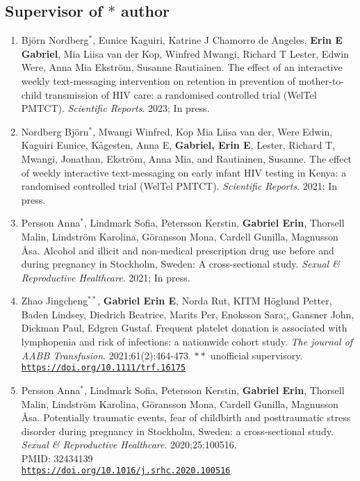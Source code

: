 \documentclass[12pt]{article}
\providecommand \url[1]{\href{#1}{#1}}
\renewcommand*\url[1]{\href{#1}{\texttt{#1}}}
\begin{document}
\subsection*{Supervisor of $*$ author}
\begin{enumerate}

\item Björn Nordberg$^*$, Eunice Kaguiri, Katrine J Chamorro de Angeles, \textbf{Erin E Gabriel}, Mia Liisa van der Kop, Winfred Mwangi, Richard T Lester, Edwin Were, Anna Mia Ekström, Susanne Rautiainen.  The effect of an interactive weekly text-messaging intervention on retention in prevention of mother-to-child transmission of HIV care: a randomised controlled trial (WelTel PMTCT). \emph{Scientific Reports}. 2023; In press.


\item Nordberg Björn$^*$,  Mwangi Winfred, Kop Mia Liisa van der, Were Edwin, Kaguiri Eunice, Kågesten, Anna E, \textbf{Gabriel, Erin E}, Lester, Richard T, Mwangi, Jonathan, Ekström, Anna Mia, and Rautiainen, Susanne. The effect of weekly interactive text-messaging on early infant HIV testing in Kenya: a randomised controlled trial (WelTel PMTCT). \emph{Scientific Reports}. 2021; In press.


\item Persson Anna$^*$, Lindmark Sofia, Petersson Kerstin, \textbf{Gabriel Erin}, Thorsell Malin, Lindström Karolina, Göransson Mona, Cardell Gunilla, Magnusson Åsa. Alcohol and illicit and non-medical prescription drug use before and during pregnancy in Stockholm, Sweden: A cross-sectional study.  \emph{Sexual \& Reproductive Healthcare}. 2021; In press.


\item Zhao Jingcheng$^{**}$, \textbf{Gabriel Erin E}, Norda Rut, KITM
Höglund Petter, Baden Lindsey, Diedrich Beatrice, Marits Per,
Enoksson Sara;, Gansner John, Dickman Paul, Edgren Gustaf. Frequent platelet donation is associated with lymphopenia and risk of infections: a nationwide cohort study. \emph{The journal of AABB Transfusion}. 2021;61(2):464-473. $**$ unofficial supervisory.\\
\url{https://doi.org/10.1111/trf.16175}


\item Persson Anna$^*$, Lindmark Sofia, Petersson Kerstin, \textbf{Gabriel Erin}, Thorsell Malin, Lindström Karolina, Göransson Mona, Cardell Gunilla, Magnusson Åsa. Potentially traumatic events, fear of childbirth and posttraumatic stress disorder during pregnancy in Stockholm, Sweden: a cross-sectional study. \emph{Sexual \& Reproductive Healthcare}. 2020;25:100516.\\
PMID: 32434139\\
\url{https://doi.org/10.1016/j.srhc.2020.100516}





\end{enumerate}
\end{document}
